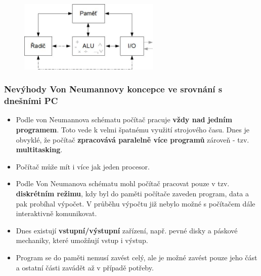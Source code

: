\begin{figure}[H]
\centering
\includegraphics[width=0.6\textwidth]{assets/1_vonNeumann}
\end{figure}

\subsubsection{Nevýhody Von Neumannovy koncepce ve srovnání s dnešními PC}
\begin{itemize}
\item Podle von Neumannova schématu počítač pracuje \textbf{vždy nad jedním programem}. Toto vede k velmi špatnému využití strojového času. Dnes je obvyklé, že počítač \textbf{zpracovává paralelně více programů} zároveň - tzv. \textbf{multitasking}.
\item Počítač může mít i více jak jeden procesor.
\item Podle Von Neumanova schématu mohl počítač pracovat pouze v tzv. \textbf{diskrétním režimu}, kdy byl do paměti počítače zaveden program, data a pak probíhal výpočet. V průběhu výpočtu již nebylo možné s počítačem dále interaktivně komunikovat.
\item Dnes existují \textbf{vstupní/výstupní} zařízení, např. pevné disky a páskové mechaniky, které umožňují vstup i výstup.
\item Program se do paměti nemusí zavést celý, ale je možné zavést pouze jeho část a ostatní části zavádět až v případě potřeby.
\end{itemize}

\noindent{}

